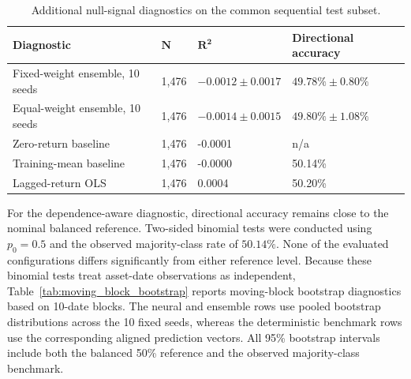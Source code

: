 \documentclass[utf8]{FrontiersinHarvard} %
\newcommand{\rev}[1]{{\color{red}#1}}
\begin{document}
\begin{table}[h]
	\color{red}
	\caption{Additional null-signal diagnostics on the common sequential test subset.}
	\label{tab:null_signal_robustness}
	\setlength{\tabcolsep}{3pt}
	\centering
	\begin{tabular}{p{170pt}p{45pt}p{90pt}p{105pt}}
		\hline
		\textbf{Diagnostic} &
		\(\boldsymbol{N}\) &
		\(\boldsymbol{R^2}\) &
		\textbf{Directional accuracy} \\
		\hline
		Fixed-weight ensemble, 10 seeds & 1,476 & \(-0.0012\pm0.0017\) & \(49.78\%\pm0.80\%\) \\
		Equal-weight ensemble, 10 seeds & 1,476 & \(-0.0014\pm0.0015\) & \(49.80\%\pm1.08\%\) \\
		Zero-return baseline & 1,476 & -0.0001 & n/a \\
		Training-mean baseline & 1,476 & -0.0000 & 50.14\% \\
		Lagged-return OLS & 1,476 & 0.0004 & 50.20\% \\
		\hline
	\end{tabular}
	\footnotesize
\end{table}

\rev{For the dependence-aware diagnostic, directional accuracy remains close to the nominal balanced reference. Two-sided binomial tests were conducted using \(p_0=0.5\) and the observed majority-class rate of \(50.14\%\). None of the evaluated configurations differs significantly from either reference level. Because these binomial tests treat asset-date observations as independent, Table~\ref{tab:moving_block_bootstrap} reports moving-block bootstrap diagnostics based on 10-date blocks. The neural and ensemble rows use pooled bootstrap distributions across the 10 fixed seeds, whereas the deterministic benchmark rows use the corresponding aligned prediction vectors. All 95\% bootstrap intervals include both the balanced 50\% reference and the observed majority-class benchmark.}
\end{document}
